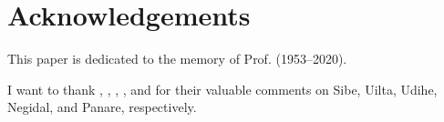 \documentclass[output=paper,colorlinks,citecolor=brown]{langscibook}
\begin{document}
\section*{Acknowledgements}

This paper is dedicated to the memory of Prof.  (1953–2020).

I want to thank , , , , and  for their valuable comments on Sibe, Uilta, Udihe, Negidal, and Panare, respectively.

{\sloppy\printbibliography[heading=subbibliography,notkeyword=this]}
\end{document}
